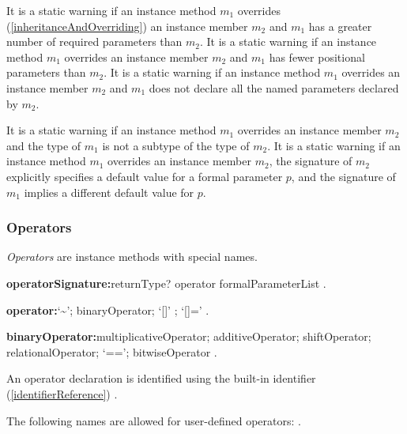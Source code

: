 \documentclass{article}
\begin{document}

\LMHash{}
It is a static warning if an instance method $m_1$ overrides (\ref{inheritanceAndOverriding}) an instance member $m_2$ and $m_1$ has a greater number of required parameters than $m_2$.
It is a static warning if an instance method $m_1$ overrides an instance member $m_2$ and $m_1$ has fewer positional parameters than $m_2$.
It is a static warning if an instance method $m_1$ overrides an instance member $m_2$ and $m_1$ does not declare all the named parameters declared by $m_2$.


\LMHash{}
It is a static warning if an instance method $m_1$ overrides an instance member $m_2$ and the type of $m_1$ is not a subtype of the type of $m_2$.
It is a static warning if an instance method $m_1$ overrides an instance member $m_2$, the signature of $m_2$ explicitly specifies a default value for a formal parameter $p$, and the signature of $m_1$ implies a different default value for $p$.



\subsubsection{Operators}

\LMHash{}
{\em Operators} are instance methods with special names.

\begin{grammar}
{\bf operatorSignature:}returnType? \OPERATOR{} operator formalParameterList
  .

{\bf operator:}`\~{}';
  binaryOperator;
  `[]' ;
  `[]='
  .

{\bf binaryOperator:}multiplicativeOperator;
  additiveOperator;
  shiftOperator;
  relationalOperator;
  `==';
  bitwiseOperator
  .
\end{grammar}

\LMHash{}
An operator declaration is identified using the built-in identifier (\ref{identifierReference}) \OPERATOR{}.

\LMHash{}
The following names are allowed for user-defined operators: \code{<, >, <=, >=, ==, -, +, /, \~{}/, *, \%, $|$, \^{}, \&, $<<$, $>>$, $>>>$, []=, [], \~{}}.
\end{document}
